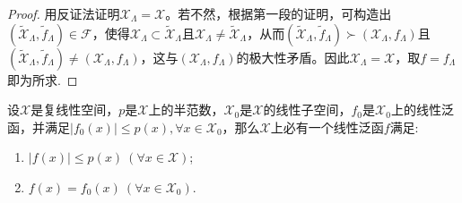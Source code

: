 \documentclass[../../main.tex]{subfiles}%
\begin{document}
\begin{proof}
用反证法证明$\mathscr{X}_\Lambda = \mathscr{X}$。若不然，根据第一段的证明，可构造出$(\widetilde{\mathscr{X}}_\Lambda, \widetilde{f}_\Lambda) \in \mathscr{F}$，使得$\mathscr{X}_\Lambda \subset \widetilde{\mathscr{X}}_\Lambda$且$\mathscr{X}_\Lambda \neq \widetilde{\mathscr{X}}_\Lambda$，从而$(\widetilde{\mathscr{X}}_\Lambda, \widetilde{f}_\Lambda) \succ (\mathscr{X}_\Lambda, f_\Lambda)$且$(\widetilde{\mathscr{X}}_\Lambda, \widetilde{f}_\Lambda) \neq (\mathscr{X}_\Lambda, f_\Lambda)$，这与$(\mathscr{X}_\Lambda, f_\Lambda)$的极大性矛盾。因此$\mathscr{X}_\Lambda = \mathscr{X}$，取$f = f_\Lambda$即为所求.

\end{proof}

\begin{theorem}\label{theorem:泛函分析--复Hahn-Banach定理}
设$\mathscr{X}$是复线性空间，$p$是$\mathscr{X}$上的半范数，$\mathscr{X}_0$是$\mathscr{X}$的线性子空间，$f_0$是$\mathscr{X}_0$上的线性泛函，并满足$|f_0(x)| \leqslant p(x), \forall x \in \mathscr{X}_0$，那么$\mathscr{X}$上必有一个线性泛函$f$满足:
\begin{enumerate}[(1)]
\item $|f(x)| \leqslant p(x) \ (\forall x \in \mathscr{X})$;
\item $f(x) = f_0(x) \ (\forall x \in \mathscr{X}_0)$.
\end{enumerate}
\end{theorem}
\end{document}
